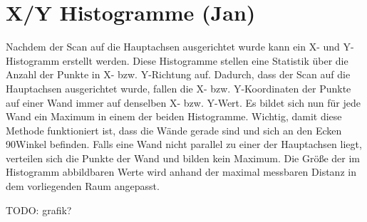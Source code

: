 \section{X/Y Histogramme (Jan)}

Nachdem der Scan auf die Hauptachsen ausgerichtet wurde kann ein X- und Y-Histogramm erstellt werden. Diese Histogramme stellen eine Statistik über die Anzahl der Punkte in X- bzw. Y-Richtung auf.
Dadurch, dass der Scan auf die Hauptachsen ausgerichtet wurde, fallen die X- bzw. Y-Koordinaten der Punkte auf einer Wand immer auf denselben X- bzw. Y-Wert. Es bildet sich nun für jede Wand ein Maximum in einem der beiden Histogramme. Wichtig, damit diese Methode funktioniert ist, dass die Wände gerade sind und sich an den Ecken 90\degree Winkel befinden. Falls eine Wand nicht parallel zu einer der Hauptachsen liegt, verteilen sich die Punkte der Wand und bilden kein Maximum. Die Größe der im Histogramm abbildbaren Werte wird anhand der maximal messbaren Distanz in dem vorliegenden Raum angepasst.

TODO: grafik?